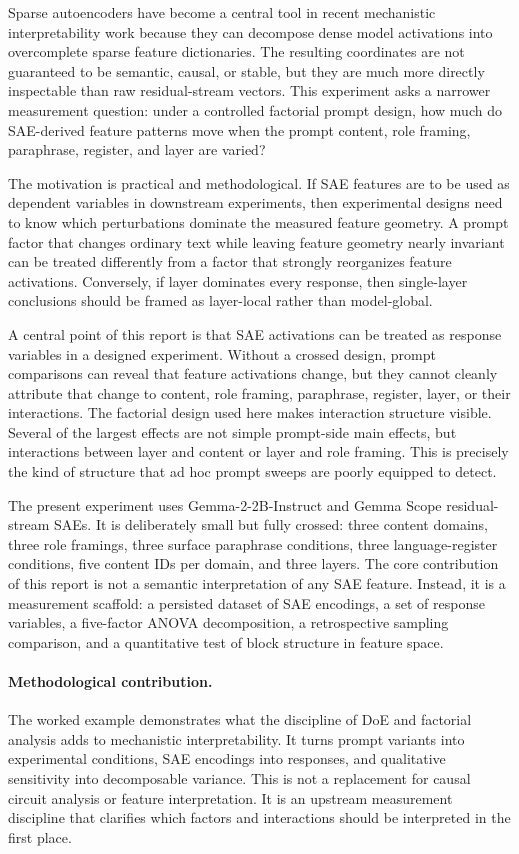 \documentclass[11pt]{article}
\begin{document}
Sparse autoencoders have become a central tool in recent mechanistic interpretability work because they can decompose dense model activations into overcomplete sparse feature dictionaries. The resulting coordinates are not guaranteed to be semantic, causal, or stable, but they are much more directly inspectable than raw residual-stream vectors. This experiment asks a narrower measurement question: under a controlled factorial prompt design, how much do SAE-derived feature patterns move when the prompt content, role framing, paraphrase, register, and layer are varied?

The motivation is practical and methodological. If SAE features are to be used as dependent variables in downstream experiments, then experimental designs need to know which perturbations dominate the measured feature geometry. A prompt factor that changes ordinary text while leaving feature geometry nearly invariant can be treated differently from a factor that strongly reorganizes feature activations. Conversely, if layer dominates every response, then single-layer conclusions should be framed as layer-local rather than model-global.

A central point of this report is that SAE activations can be treated as response variables in a designed experiment. Without a crossed design, prompt comparisons can reveal that feature activations change, but they cannot cleanly attribute that change to content, role framing, paraphrase, register, layer, or their interactions. The factorial design used here makes interaction structure visible. Several of the largest effects are not simple prompt-side main effects, but interactions between layer and content or layer and role framing. This is precisely the kind of structure that ad hoc prompt sweeps are poorly equipped to detect.

The present experiment uses Gemma-2-2B-Instruct and Gemma Scope residual-stream SAEs. It is deliberately small but fully crossed: three content domains, three role framings, three surface paraphrase conditions, three language-register conditions, five content IDs per domain, and three layers. The core contribution of this report is not a semantic interpretation of any SAE feature. Instead, it is a measurement scaffold: a persisted dataset of SAE encodings, a set of response variables, a five-factor ANOVA decomposition, a retrospective sampling comparison, and a quantitative test of block structure in feature space.

\paragraph{Methodological contribution.}
The worked example demonstrates what the discipline of DoE and factorial analysis adds to mechanistic interpretability. It turns prompt variants into experimental conditions, SAE encodings into responses, and qualitative sensitivity into decomposable variance. This is not a replacement for causal circuit analysis or feature interpretation. It is an upstream measurement discipline that clarifies which factors and interactions should be interpreted in the first place.
\end{document}
